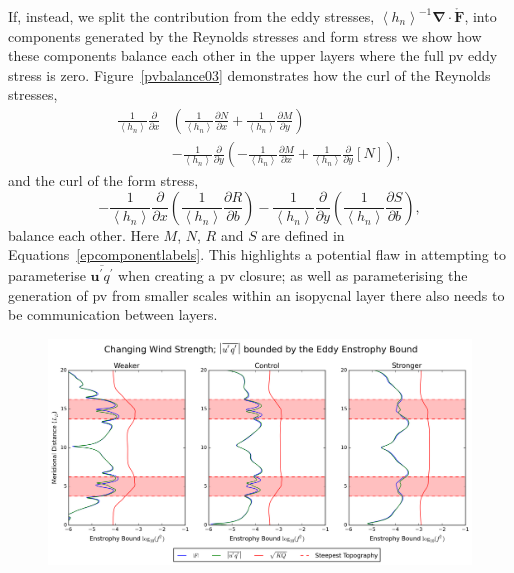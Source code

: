 \documentclass[12pt,a4paper]{report}
\newcommand*\thkmean[1]{\overline{#1}}
\newcommand*\thkres[1]{{#1}^{\prime}}
\newcommand*\nthkmean[1]{\left\langle{#1}\right\rangle}
\newcommand*\spec[1]{\mathring{#1}}
\newcommand*\figref[1]{Figure~\ref{#1}}
\newcommand*{\partialdiff}[2][{}]{\frac{\partial #1}{\partial #2}}
\begin{document}
  If, instead, we split the contribution from the eddy stresses, $\nthkmean{h_{n}}^{-1}
  \boldsymbol{\nabla}\cdot\boldsymbol{\spec{F}}$, into components generated by the 
  Reynolds stresses and form stress we show how these components balance each other in
  the upper layers where the full \gls{pv} eddy stress is zero. \figref{pvbalance03}
  demonstrates how the curl of the Reynolds stresses,
  \begin{equation}
  \begin{split}
  \frac{1}{\nthkmean{h_{n}}}\partialdiff{x}&\left(
  \frac{1}{\nthkmean{h_{n}}}\partialdiff[N]{x} +
  \frac{1}{\nthkmean{h_{n}}}\partialdiff[M]{y}\right)\\ &-
  \frac{1}{\nthkmean{h_{n}}}\partialdiff{y}\left(
  -\frac{1}{\nthkmean{h_{n}}}\partialdiff[M]{x} +
  \frac{1}{\nthkmean{h_{n}}}\partialdiff{y}[N]\right),
  \end{split}
  \end{equation}
  and the curl of the form stress,
  \begin{equation}
  -\frac{1}{\nthkmean{h_{n}}}\partialdiff{x}\left(
  \frac{1}{\nthkmean{h_{n}}}\partialdiff[R]{b}\right) -
  \frac{1}{\nthkmean{h_{n}}}\partialdiff{y}\left(
  \frac{1}{\nthkmean{h_{n}}}\partialdiff[S]{b}\right) ,
  \end{equation}
  balance each other. Here $M$, $N$, $R$ and $S$ are defined in
   Equations~\ref{epcomponentlabels}.  This highlights a potential flaw in
   attempting to parameterise $\thkmean{\thkres{\boldsymbol{u}}\thkres{q}}$ when 
   creating a \gls{pv} closure; as well as parameterising the generation 
   of \gls{pv} from smaller scales within an isopycnal layer there also
   needs to be communication between layers. 
   
   \begin{figure}
   	\centering
   	\includegraphics[width=\linewidth]{eqbound_0_1}
   	\caption{ }
   \end{figure}
   
\end{document}
